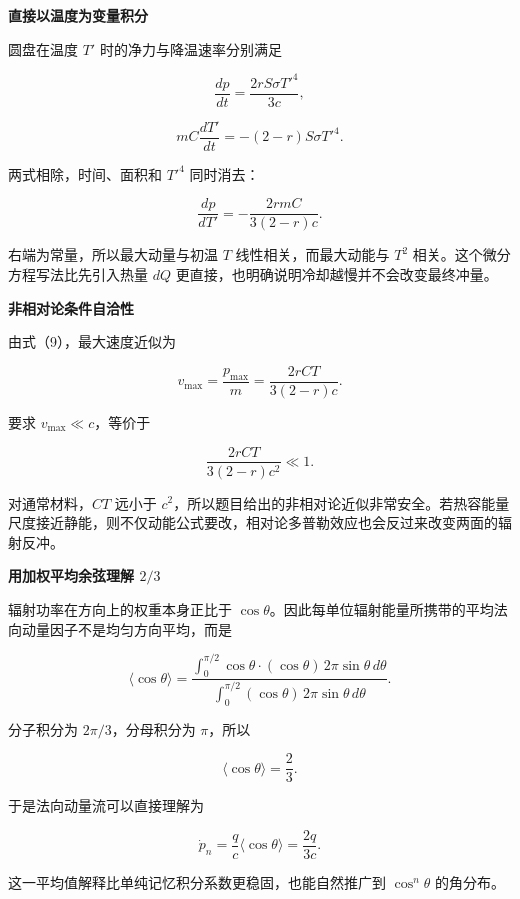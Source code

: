 \documentclass[12pt,a4paper,UTF8]{ctexart}
\begin{document}
\textbf{直接以温度为变量积分}

圆盘在温度 \(T'\) 时的净力与降温速率分别满足

\[
\frac{dp}{dt}=\frac{2rS\sigma T'^4}{3c},
\]

\[
mC\frac{dT'}{dt}=-(2-r)S\sigma T'^4.
\]

两式相除，时间、面积和 \(T'^4\) 同时消去：

\[
\frac{dp}{dT'}
=-\frac{2rmC}{3(2-r)c}.
\]

右端为常量，所以最大动量与初温 \(T\) 线性相关，而最大动能与 \(T^2\)
相关。这个微分方程写法比先引入热量 \(dQ\)
更直接，也明确说明冷却越慢并不会改变最终冲量。

\textbf{非相对论条件自洽性}

由式（9），最大速度近似为

\[
v_{\max}=\frac{p_{\max}}m
=\frac{2rCT}{3(2-r)c}.
\]

要求 \(v_{\max}\ll c\)，等价于

\[
\frac{2rCT}{3(2-r)c^2}\ll1.
\]

对通常材料，\(CT\) 远小于
\(c^2\)，所以题目给出的非相对论近似非常安全。若热容能量尺度接近静能，则不仅动能公式要改，相对论多普勒效应也会反过来改变两面的辐射反冲。

\textbf{用加权平均余弦理解 \(2/3\)}

辐射功率在方向上的权重本身正比于
\(\cos\theta\)。因此每单位辐射能量所携带的平均法向动量因子不是均匀方向平均，而是

\[
\langle\cos\theta\rangle
=\frac{\int_0^{\pi/2}\cos\theta\cdot
(\cos\theta)\,2\pi\sin\theta\,d\theta}
{\int_0^{\pi/2}(\cos\theta)\,2\pi\sin\theta\,d\theta}.
\]

分子积分为 \(2\pi/3\)，分母积分为 \(\pi\)，所以

\[
\langle\cos\theta\rangle=\frac23.
\]

于是法向动量流可以直接理解为

\[
\dot p_n=\frac qc\langle\cos\theta\rangle
=\frac{2q}{3c}.
\]

这一平均值解释比单纯记忆积分系数更稳固，也能自然推广到 \(\cos^n\theta\)
的角分布。
\end{document}
